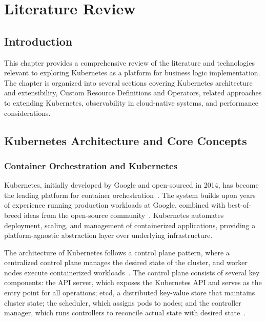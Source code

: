 \chapter{Literature Review}\label{chap:lr}

\section{Introduction}

This chapter provides a comprehensive review of the literature and technologies relevant to exploring Kubernetes as a platform for business logic implementation. The chapter is organized into several sections covering Kubernetes architecture and extensibility, Custom Resource Definitions and Operators, related approaches to extending Kubernetes, observability in cloud-native systems, and performance considerations.

\section{Kubernetes Architecture and Core Concepts}

\subsection{Container Orchestration and Kubernetes}

Kubernetes, initially developed by Google and open-sourced in 2014, has become the leading platform for container orchestration~\cite{kubernetes, luksa2017}. The system builds upon years of experience running production workloads at Google, combined with best-of-breed ideas from the open-source community~\cite{cncf, hightower2017}. Kubernetes automates deployment, scaling, and management of containerized applications, providing a platform-agnostic abstraction layer over underlying infrastructure.

The architecture of Kubernetes follows a control plane pattern, where a centralized control plane manages the desired state of the cluster, and worker nodes execute containerized workloads~\cite{k8s_architecture, luksa2017}. The control plane consists of several key components: the API server, which exposes the Kubernetes API and serves as the entry point for all operations; etcd, a distributed key-value store that maintains cluster state; the scheduler, which assigns pods to nodes; and the controller manager, which runs controllers to reconcile actual state with desired state~\cite{ibryam2020}.


